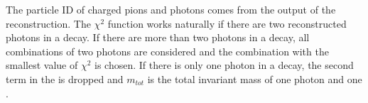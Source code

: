 
The particle ID of charged pions and photons comes from the output of the \pandora reconstruction. The $\chi^{2}$ function works naturally if there are two reconstructed photons in a decay. If there are more than two photons in a decay, all combinations of two photons are considered and the combination with the smallest value of $\chi^2$ is chosen. If there is only one photon in a decay, the second term in the  is dropped and $m_{tot}$ is the total invariant mass of one photon and one \Pgpm.

